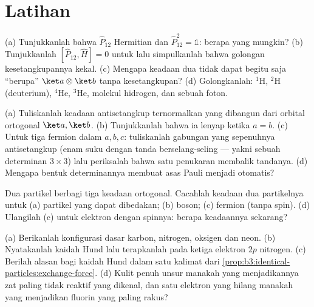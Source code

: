 \section{Latihan}

\begin{exercise}[$\star$]\label{exo:b3:identical-particles:1}
(a) Tunjukkanlah bahwa $\hat P_{12}$ Hermitian dan $\hat P_{12}^2 = \mathbb 1$:
berapa  yang mungkin? (b) Tunjukkanlah $[\hat P_{12}, \hat H] =
0$ untuk  lalu simpulkanlah bahwa golongan
kesetangkupannya kekal. (c) Mengapa keadaan dua  tidak
dapat begitu saja ``berupa'' $\ket a\otimes\ket b$ tanpa kesetangkupan?
(d) Golongkanlah: $^1$H, $^2$H (deuterium), $^4$He, $^3$He, molekul
hidrogen, dan sebuah foton.
\end{exercise}

\begin{exercise}[$\star$]\label{exo:b3:identical-particles:2}
(a) Tuliskanlah keadaan antisetangkup ternormalkan yang dibangun dari
orbital ortogonal $\ket a, \ket b$. (b) Tunjukkanlah bahwa ia lenyap
ketika $a = b$. (c) Untuk tiga fermion dalam $a, b, c$: tuliskanlah
gabungan yang sepenuhnya antisetangkup (enam suku dengan tanda
berselang-seling --- yakni sebuah determinan $3\times3$) lalu periksalah
bahwa satu penukaran membalik tandanya. (d) Mengapa bentuk determinannya
membuat asas Pauli menjadi otomatis?
\end{exercise}

\begin{exercise}[$\star$]\label{exo:b3:identical-particles:3}
Dua partikel berbagi tiga keadaan ortogonal. Cacahlah keadaan dua
partikelnya untuk (a) partikel yang dapat dibedakan; (b) boson; (c)
fermion (tanpa spin). (d) Ulangilah (c) untuk elektron dengan spinnya:
berapa keadaannya sekarang?
\end{exercise}

\begin{exercise}[$\star$]\label{exo:b3:identical-particles:4}
(a) Berikanlah konfigurasi dasar karbon, nitrogen, oksigen dan neon. (b)
Nyatakanlah kaidah Hund lalu terapkanlah pada ketiga elektron $2p$
nitrogen. (c) Berilah alasan bagi kaidah Hund dalam satu kalimat dari
\cref{prop:b3:identical-particles:exchange-force}. (d) Kulit penuh unsur
manakah yang menjadikannya zat paling tidak reaktif yang dikenal, dan
satu elektron yang hilang manakah yang menjadikan fluorin yang paling
rakus?
\end{exercise}

